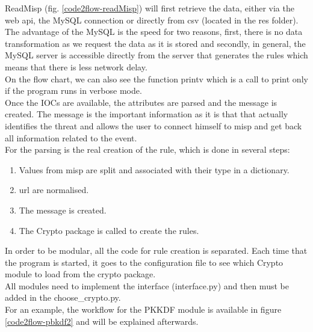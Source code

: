 \documentclass{eplmastersthesis}
\begin{document}
ReadMisp (fig. \ref{code2flow-readMisp}) will first retrieve the data, either via the web \gls{api}, the MySQL connection or directly from \gls{csv} (located in the res folder). The advantage of the MySQL is the speed for two reasons, first, there is no data transformation as we request the data as it is stored and secondly, in general, the MySQL server is accessible directly from the server that generates the rules which means that there is less network delay.\\
On the flow chart, we can also see the function printv which is a call to print only if the program runs in verbose mode.\\
Once the IOCs are available, the attributes are parsed and the message is created. The message is the important information as it is that that actually identifies the threat and allows the user to connect himself to \gls{misp} and get back all information related to the event.\\
For the parsing is the real creation of the rule, which is done in several steps:

\begin{enumerate}
\item Values from \gls{misp} are split and associated with their type in a dictionary.
\item \gls{url} are normalised.
\item The message is created.
\item The Crypto package is called to create the rules.
\end{enumerate}

In order to be modular, all the code for rule creation is separated. Each time that the program is started, it goes to the configuration file to see which Crypto module to load from the crypto package.\\
All modules need to implement the interface (interface.py) and then must be added in the choose\_crypto.py.\\
For an example, the workflow for the PKKDF module is available in figure \ref{code2flow-pbkdf2} and will be explained afterwards.
\end{document}
